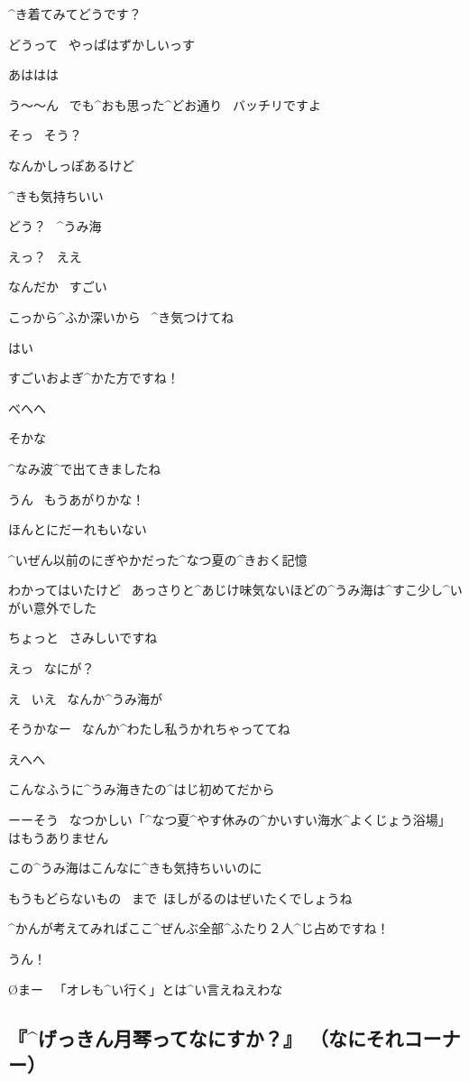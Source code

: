 \K ^{き}{着}てみてどうです？

\A どうって
\ やっぱはずかしいっす

\A あははは

\K う〜〜ん
\ でも^{おも}{思}った^{どお}{通}り
\ バッチリですよ

\A そっ
\ そう？

\A なんかしっぽあるけど

\page
\K ^{きも}{気持}ちいい

\page
\A どう？
\ ^{うみ}{海}

\K えっ？
\ ええ

\K なんだか
\ すごい

\A こっから^{ふか}{深}いから
\ ^{き}{気}つけてね

\K はい

\page[30]
\K すごいおよぎ^{かた}{方}ですね！

\A べへへ

\A そかな

\page
\K ^{なみ}{波}^{で}{出}てきましたね

\A うん
\ もうあがりかな！

\K ほんとにだーれもいない

\K ^{いぜん}{以前}のにぎやかだった^{なつ}{夏}の^{きおく}{記憶}

\K わかってはいたけど
\ あっさりと^{あじけ}{味気}ないほどの^{うみ}{海}は^{すこ}{少}し^{いがい}{意外}でした

\page
\K ちょっと
\ さみしいですね

\A えっ
\ なにが？

\K え
\ いえ
\ なんか^{うみ}{海}が

\A そうかなー
\ なんか^{わたし}{私}うかれちゃっててね

\A えへへ

\A こんなふうに^{うみ}{海}きたの^{はじ}{初}めてだから

\page
\N ーーそう
\ なつかしい「^{なつ}{夏}^{やす}{休}みの^{かいすい}{海水}^{よくじょう}{浴場}」はもうありません

\N この^{うみ}{海}はこんなに^{きも}{気持}ちいいのに

\N もうもどらないもの
\ まで\ ほしがるのはぜいたくでしょうね

\K ^{かんが}{考}えてみればここ^{ぜんぶ}{全部}^{ふたり}{２人}^{じ}{占}めですね！

\A うん！

\page
\O まー
\ 「オレも^{い}{行}く」とは^{い}{言}えねえわな


\subsection{『^{げっきん}{月琴}ってなにすか？』 （なにそれコーナー）}

